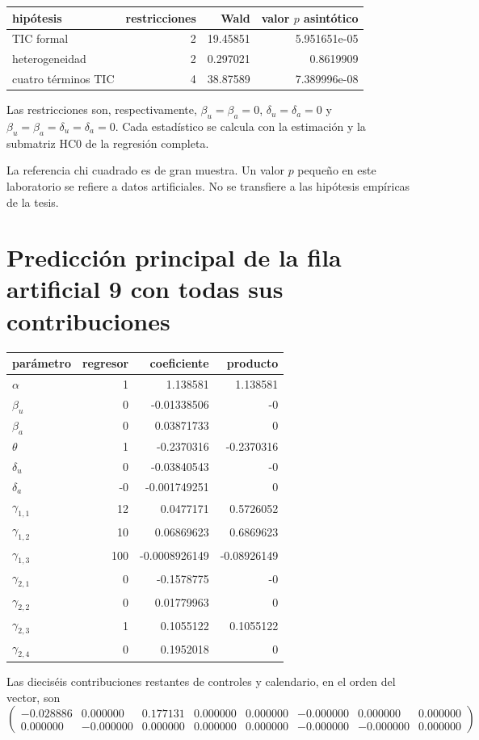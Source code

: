 \documentclass[11pt,a4paper]{article}
\begin{document}
\begin{center}\small
\begin{tabular}{lrrr}
\toprule
hipótesis & restricciones & Wald & valor $p$ asintótico\\\midrule
TIC formal & 2 & 19.45851 & 5.951651e-05\\
heterogeneidad & 2 & 0.297021 & 0.8619909\\
cuatro términos TIC & 4 & 38.87589 & 7.389996e-08\\
\bottomrule
\end{tabular}\end{center}

Las restricciones son, respectivamente,
$\beta_u=\beta_a=0$,
$\delta_u=\delta_a=0$ y
$\beta_u=\beta_a=\delta_u=\delta_a=0$.
Cada estadístico se calcula con la estimación y la submatriz HC0 de la regresión completa.

La referencia chi cuadrado es de gran muestra. Un valor $p$ pequeño en este laboratorio se refiere a datos artificiales. No se transfiere a las hipótesis empíricas de la tesis.

\clearpage
\section{Predicción principal de la fila artificial 9 con todas sus contribuciones}

\begin{center}\small
\begin{tabular}{lrrr}
\toprule
parámetro & regresor & coeficiente & producto\\\midrule
$\alpha$ & 1 & 1.138581 & 1.138581\\
$\beta_u$ & 0 & -0.01338506 & -0\\
$\beta_a$ & 0 & 0.03871733 & 0\\
$\theta$ & 1 & -0.2370316 & -0.2370316\\
$\delta_u$ & 0 & -0.03840543 & -0\\
$\delta_a$ & -0 & -0.001749251 & 0\\
$\gamma_{1,1}$ & 12 & 0.0477171 & 0.5726052\\
$\gamma_{1,2}$ & 10 & 0.06869623 & 0.6869623\\
$\gamma_{1,3}$ & 100 & -0.0008926149 & -0.08926149\\
$\gamma_{2,1}$ & 0 & -0.1578775 & -0\\
$\gamma_{2,2}$ & 0 & 0.01779963 & 0\\
$\gamma_{2,3}$ & 1 & 0.1055122 & 0.1055122\\
$\gamma_{2,4}$ & 0 & 0.1952018 & 0\\
\bottomrule
\end{tabular}\end{center}
Las dieciséis contribuciones restantes de controles y calendario, en el orden del vector, son
\[
\begin{pmatrix}-0.028886 & 0.000000 & 0.177131 & 0.000000 & 0.000000 & -0.000000 & 0.000000 & 0.000000\\0.000000 & -0.000000 & 0.000000 & 0.000000 & 0.000000 & -0.000000 & -0.000000 & 0.000000\end{pmatrix}
\]
\end{document}
